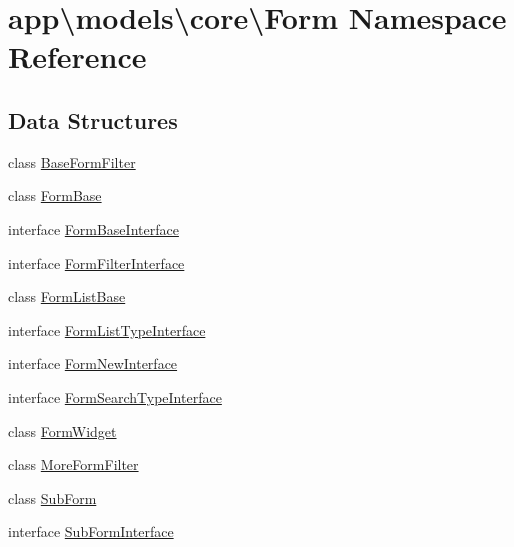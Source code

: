 \hypertarget{namespaceapp_1_1models_1_1core_1_1_form}{\section{app\textbackslash{}models\textbackslash{}core\textbackslash{}Form Namespace Reference}
\label{namespaceapp_1_1models_1_1core_1_1_form}
}
\subsection*{Data Structures}
\begin{DoxyCompactItemize}
\item 
class \hyperlink{classapp_1_1models_1_1core_1_1_form_1_1_base_form_filter}{Base\-Form\-Filter}
\item 
class \hyperlink{classapp_1_1models_1_1core_1_1_form_1_1_form_base}{Form\-Base}
\item 
interface \hyperlink{interfaceapp_1_1models_1_1core_1_1_form_1_1_form_base_interface}{Form\-Base\-Interface}
\item 
interface \hyperlink{interfaceapp_1_1models_1_1core_1_1_form_1_1_form_filter_interface}{Form\-Filter\-Interface}
\item 
class \hyperlink{classapp_1_1models_1_1core_1_1_form_1_1_form_list_base}{Form\-List\-Base}
\item 
interface \hyperlink{interfaceapp_1_1models_1_1core_1_1_form_1_1_form_list_type_interface}{Form\-List\-Type\-Interface}
\item 
interface \hyperlink{interfaceapp_1_1models_1_1core_1_1_form_1_1_form_new_interface}{Form\-New\-Interface}
\item 
interface \hyperlink{interfaceapp_1_1models_1_1core_1_1_form_1_1_form_search_type_interface}{Form\-Search\-Type\-Interface}
\item 
class \hyperlink{classapp_1_1models_1_1core_1_1_form_1_1_form_widget}{Form\-Widget}
\item 
class \hyperlink{classapp_1_1models_1_1core_1_1_form_1_1_more_form_filter}{More\-Form\-Filter}
\item 
class \hyperlink{classapp_1_1models_1_1core_1_1_form_1_1_sub_form}{Sub\-Form}
\item 
interface \hyperlink{interfaceapp_1_1models_1_1core_1_1_form_1_1_sub_form_interface}{Sub\-Form\-Interface}
\end{DoxyCompactItemize}
